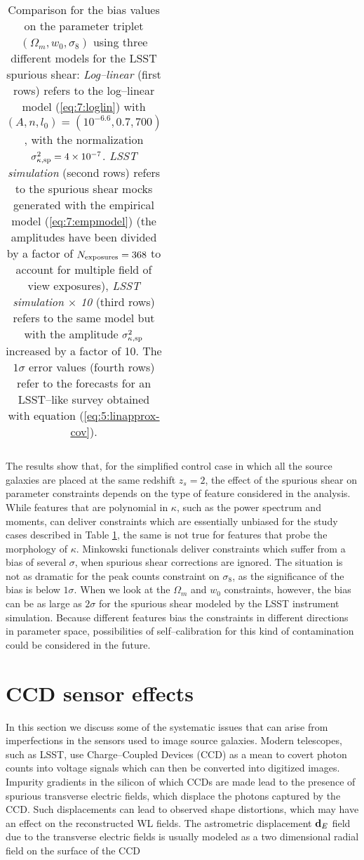 \begin{table}
\begin{center}
\begin{tabular}{c|ccc}
\end{tabular}
\end{center}

\caption{Comparison for the bias values on the parameter triplet $(\Omega_m,w_0,\sigma_8)$ using three different models for the LSST spurious shear: \textit{Log--linear} (first rows) refers to the log--linear model (\ref{eq:7:loglin}) with $(A,n,l_0)=(10^{-6.6},0.7,700)$, with the normalization $\sigma^2_{\kappa,{\rm sp}}=4\times10^{-7}$. \textit{LSST simulation} (second rows) refers to the spurious shear mocks generated with the empirical model (\ref{eq:7:empmodel}) (the amplitudes have been divided by a factor of $N_{\rm exposures}=368$ to account for multiple field of view exposures), \textit{LSST simulation $\times$ 10} (third rows) refers to the same model but with the amplitude $\sigma^2_{\kappa,{\rm sp}}$ increased by a factor of 10. The $1\sigma$ error values (fourth rows) refer to the forecasts for an LSST--like survey obtained with equation (\ref{eq:5:linapprox-cov}).}
\label{tab:7:spbias}
\end{table}
%
The results show that, for the simplified control case in which all the source galaxies are placed at the same redshift $z_s=2$, the effect of the spurious shear on parameter constraints depends on the type of feature considered in the analysis. While features that are polynomial in $\kappa$, such as the power spectrum and moments, can deliver constraints which are essentially unbiased for the study cases described in Table \ref{tab:7:spbias}, the same is not true for features that probe the morphology of $\kappa$. Minkowski functionals deliver constraints which suffer from a bias of several $\sigma$, when spurious shear corrections are ignored. The situation is not as dramatic for the peak counts constraint on $\sigma_8$, as the significance of the bias is below $1\sigma$. When we look at the $\Omega_m$ and $w_0$ constraints, however, the bias can be as large as $2\sigma$ for the spurious shear modeled by the LSST instrument simulation. Because different features bias the constraints in different directions in parameter space, possibilities of self--calibration for this kind of contamination could be considered in the future.

\section{CCD sensor effects}
In this section we discuss some of the systematic issues that can arise from imperfections in the sensors used to image source galaxies. Modern telescopes, such as LSST, use Charge--Coupled Devices (CCD) \citep{CCDBook,LSST,LSSTOperations} as a mean to covert photon counts into voltage signals which can then be converted into digitized images. Impurity gradients in the silicon of which CCDs are made lead to the presence of spurious transverse electric fields, which displace the photons captured by the CCD. Such displacements can lead to observed shape distortions, which may have an effect on the reconstructed WL fields. The astrometric displacement $\mathbf{d}_E$ field due to the transverse electric fields is usually modeled as a two dimensional radial field \citep{PetriCCD} on the surface of the CCD

